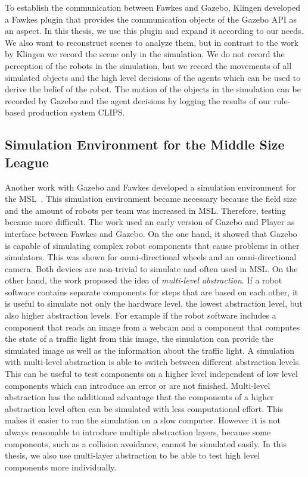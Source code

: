 To establish the communication between Fawkes and Gazebo, Klingen developed a Fawkes plugin that provides the communication objects of the Gazebo API as an aspect. In this thesis, we use this plugin and expand it according to our needs. We also want to reconstruct scenes to analyze them, but in contrast to the work by Klingen we record the scene only in the simulation. We do not record the perception of the robots in the simulation, but we record the movements of all simulated objects and the high level decisions of the agents which can be used to derive the belief of the robot. The motion of the objects in the simulation can be recorded by Gazebo and the agent decisions by logging the results of our rule-based production system CLIPS.

\subsection{Simulation Environment for the Middle Size League}
Another work with Gazebo and Fawkes developed a simulation environment for the MSL~\cite{MultiLevelAbstraction}. This simulation environment became necessary because the field size and the amount of robots per team was increased in MSL. Therefore, testing became more difficult. The work used an early version of Gazebo and Player as interface between Fawkes and Gazebo. On the one hand, it showed that Gazebo is capable of simulating complex robot components that cause problems in other simulators. This was shown for omni-directional wheels and an omni-directional camera. Both devices are non-trivial to simulate and often used in MSL. On the other hand, the work proposed the idea of \textit{multi-level abstraction}. If a robot software contains separate components for steps that are based on each other, it is useful to simulate not only the hardware level, the lowest abstraction level, but also higher abstraction levels. For example if the robot software includes a component that reads an image from a webcam and a component that computes the state of a traffic light from this image, the simulation can provide the simulated image as well as the information about the traffic light. A simulation with multi-level abstraction is able to switch between different abstraction levels. This can be useful to test components on a higher level independent of low level components which can introduce an error or are not finished. Multi-level abstraction has the additional advantage that the components of a higher abstraction level often can be simulated with less computational effort. This makes it easier to run the simulation on a slow computer. However it is not always reasonable to introduce multiple abstraction layers, because some components, such as a collision avoidance, cannot be simulated easily. In this thesis, we also use multi-layer abstraction to be able to test high level components more individually.


